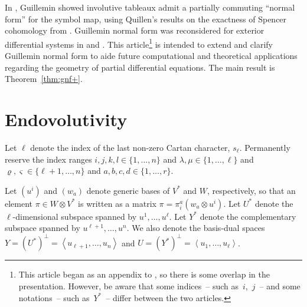 \documentclass[pdftex]{sigma}
\numberwithin{equation}{section}
\newcommand{\pair}[1]{\ensuremath{\left\langle #1 \right\rangle}}
\begin{document}
In \cite{Guillemin1968}, Guillemin showed involutive tableaux admit
a partially commuting ``normal form'' for the symbol map, using Quillen's results on the
exactness of Spencer cohomology from \cite{Quillen1964}.  Guillemin normal form
was reconsidered for exterior dif\/ferential systems in \cite{Yang1987} and
\cite{BCGGG}.  This
article\footnote{This article began as an appendix to \cite{Smith2014b}, so there is some overlap in the presentation.
However, be aware that some indices~-- such as~$i$,~$j$~-- and some notations~-- such
as~$Y^*$~-- dif\/fer between the two articles.}
is intended to extend and clarify Guillemin normal form
to aide future computational and theoretical applications regarding the
geometry of partial
dif\/ferential equations.  The main result is Theorem~\ref{thm:gnf+}.

\section{Endovolutivity}
\label{sec:notation}
Let $\ell$ denote the index of the last non-zero Cartan character, $s_\ell$.
Permanently reserve the index ranges
$i,j,k,l \in \{ 1, \ldots, n\}$ and
$\lambda,\mu \in \{ 1, \ldots, \ell\}$ and
$\varrho, \varsigma \in \{ \ell+1, \ldots, n\}$ and
$a,b,c,d \in \{1, \ldots, r\}$.

Let $(u^i)$ and $(w_a)$ denote generic bases of $V^*$ and $W$, respectively, so that an
element $\pi \in W \otimes V^*$ is written as a matrix $\pi = \pi^a_i
(w_a \otimes u^i)$.
Let $U^*$ denote the $\ell$-dimensional subspace spanned by $u^1, \ldots,
u^\ell$. Let $Y^*$ denote the complementary subspace spanned by $u^{\ell+1},
\ldots, u^n$.
We also denote the basis-dual spaces $Y=(U^*)^\perp=\pair{u_{\ell+1},\ldots,u_n}$ and $U = (Y^*)^\perp = \pair{u_1,
\ldots, u_\ell}$.
\end{document}

